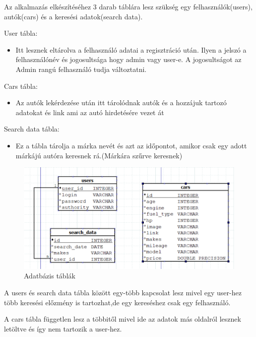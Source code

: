 
Az alkalmazás elkészítéséhez 3 darab táblára lesz szükség egy
felhasználók(users), autók(cars) és a keresési adatok(search data).

User tábla:
\begin{itemize}
\item Itt lesznek eltárolva a felhasználó adatai a regisztráció után. Ilyen a jelszó a felhasználónév és jogosultsága hogy admin vagy user-e. A jogosultságot az Admin rangú felhasználó tudja változtatni.
\end{itemize}

Cars tábla:
\begin{itemize}
\item Az autók lekérdezése után itt tárolódnak autók és a hozzájuk tartozó adatokat és link ami az autó hirdetésére vezet át
\end{itemize}

Search data tábla:
\begin{itemize}
\item Ez a tábla tárolja a márka nevét és azt az időpontot, amikor csak egy adott márkájú autóra keresnek rá.(Márkára szűrve keresnek)
\end{itemize}
 
 \begin{figure}[h]
\centering
\includegraphics[scale=0.6]{images/Data_Table.png}
\caption{Adatbázis táblák}
\label{fig:DataTable}
\end{figure}

A users és search data tábla között egy-több kapcsolat lesz mivel egy user-hez több keresési előzmény is tartozhat,de egy kereséshez csak egy felhasználó.

A cars tábla független lesz a többitől mivel ide az adatok más oldalról lesznek letöltve és így nem tartozik a user-hez.

